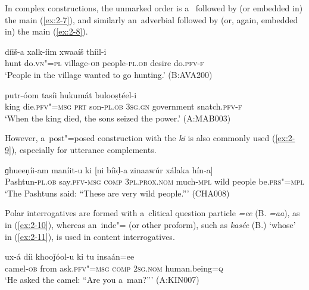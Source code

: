 In complex constructions, the unmarked order is a~ followed by (or embedded in) the main  (\ref{ex:2-7}), and similarly an~adverbial  followed by (or, again, embedded in) the main  (\ref{ex:2-8}). 

\begin{exe}
\ex
\label{ex:2-7}
 díiš-a xalk-íim xwaaíš thíil-i \\
	hunt do.\textsc{vn"=pl} village\textsc{-ob} people\textsc{-pl.ob} desire do.\textsc{pfv-f} \\
\glt `People in the village wanted to go hunting.' (B:AVA200)
\end{exe}

\begin{exe}
\ex
\label{ex:2-8}
 putr-óom tasíi hukumát bulooṣṭéel-i \\
	king die.\textsc{pfv"=msg} \textsc{prt} son\textsc{-pl.ob} \textsc{3sg.gn} government snatch.\textsc{pfv-f} \\
\glt `When the king died, the sons seized the power.' (A:MAB003)
\end{exe}

However, a~post"=posed construction with the  \textit{ki} is also commonly used (\ref{ex:2-9}), especially for utterance complements.

\begin{exe}
\ex
\label{ex:2-9}
\gll ɡhueeṇíi-am maníit-u ki [ni bíiḍ-a zinaawúr xálaka hín-a] \\
	Pashtun-\textsc{pl.ob} say.\textsc{pfv-msg} \textsc{comp} \textsc{3pl.prox.nom} much-\textsc{mpl} wild people be.\textsc{prs"=mpl} \\
\glt `The Pashtuns said: ``These are very wild people.''' (CHA008)
\end{exe}

Polar interrogatives are formed with a~clitical question particle \textit{=ee} (B. \textit{=aa}), as in (\ref{ex:2-10}), whereas an~inde"=  (or other proform), such as \textit{kasée} (B.) `whose' in (\ref{ex:2-11}), is used in content interrogatives. 

\begin{exe}
\ex
\label{ex:2-10}
\gll ux-á díi khooǰóol-u ki tu insaán=ee \\
	camel-\textsc{ob} from ask.\textsc{pfv"=msg} \textsc{comp} \textsc{2sg.nom} human.being=\textsc{q} \\
\glt `He asked the camel: ``Are you a~man?''' (A:KIN007)
\end{exe}


